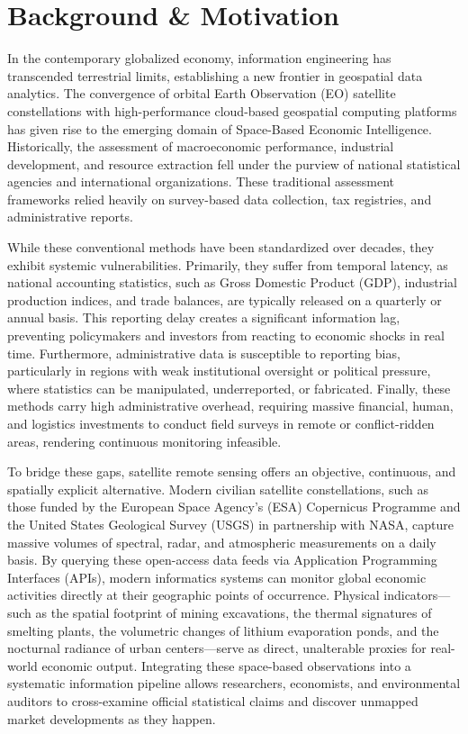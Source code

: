 
\section{Background \& Motivation}
In the contemporary globalized economy, information engineering has transcended terrestrial limits, establishing a new frontier in geospatial data analytics. The convergence of orbital Earth Observation (EO) satellite constellations with high-performance cloud-based geospatial computing platforms has given rise to the emerging domain of Space-Based Economic Intelligence. Historically, the assessment of macroeconomic performance, industrial development, and resource extraction fell under the purview of national statistical agencies and international organizations. These traditional assessment frameworks relied heavily on survey-based data collection, tax registries, and administrative reports. 

While these conventional methods have been standardized over decades, they exhibit systemic vulnerabilities. Primarily, they suffer from temporal latency, as national accounting statistics, such as Gross Domestic Product (GDP), industrial production indices, and trade balances, are typically released on a quarterly or annual basis. This reporting delay creates a significant information lag, preventing policymakers and investors from reacting to economic shocks in real time. Furthermore, administrative data is susceptible to reporting bias, particularly in regions with weak institutional oversight or political pressure, where statistics can be manipulated, underreported, or fabricated. Finally, these methods carry high administrative overhead, requiring massive financial, human, and logistics investments to conduct field surveys in remote or conflict-ridden areas, rendering continuous monitoring infeasible.

To bridge these gaps, satellite remote sensing offers an objective, continuous, and spatially explicit alternative. Modern civilian satellite constellations, such as those funded by the European Space Agency's (ESA) Copernicus Programme and the United States Geological Survey (USGS) in partnership with NASA, capture massive volumes of spectral, radar, and atmospheric measurements on a daily basis. By querying these open-access data feeds via Application Programming Interfaces (APIs), modern informatics systems can monitor global economic activities directly at their geographic points of occurrence. Physical indicators—such as the spatial footprint of mining excavations, the thermal signatures of smelting plants, the volumetric changes of lithium evaporation ponds, and the nocturnal radiance of urban centers—serve as direct, unalterable proxies for real-world economic output. Integrating these space-based observations into a systematic information pipeline allows researchers, economists, and environmental auditors to cross-examine official statistical claims and discover unmapped market developments as they happen.

